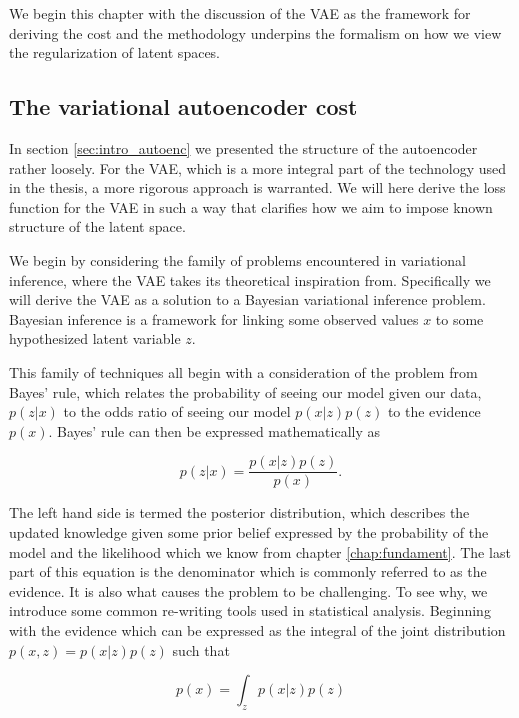 We begin this chapter with the discussion of the VAE as the framework for deriving the cost and the methodology underpins the formalism on how we view the regularization of latent spaces.

\subsection{The variational autoencoder cost}

In section \ref{sec:intro_autoenc} we presented the structure of the autoencoder rather loosely. For the VAE, which is a more integral part of the technology used in the thesis, a more rigorous approach is warranted. We will here derive the loss function for the VAE in such a way that clarifies how we aim to impose known structure of the latent space.

We begin by considering the family of problems encountered in variational inference, where the VAE takes its theoretical inspiration from. Specifically we will derive the VAE  as a solution to a Bayesian variational inference problem. Bayesian inference is a framework for linking some observed values $x$ to some hypothesized latent variable $z$. 

This family of techniques all begin with a consideration of the problem from Bayes' rule, which relates the probability of seeing our model given our data, $p(z|x)$ to the odds ratio of seeing our model $p(x|z)p(z)$ to the evidence $p(x)$. Bayes' rule can then be expressed mathematically as 

 \begin{equation}\label{eq:bayes}
 p(z| x) = \frac{p(x|z) p(z)}{p(x)}.
 \end{equation}

 \noindent The left hand side is termed the posterior distribution, which describes the updated knowledge given some prior belief expressed by the probability of the model and the likelihood which we know from chapter \ref{chap:fundament}. The last part of this equation is the denominator which is commonly referred to as the evidence. It is also what causes the problem to be challenging. To see why, we introduce some common re-writing tools used in statistical analysis. Beginning with the evidence which can be expressed as the integral of the joint distribution $p(x, z) = p(x|z)p(z)$ such that

\begin{equation}\label{eq:evidence}
p(x) = \int_z p(x|z)p(z)
\end{equation}

